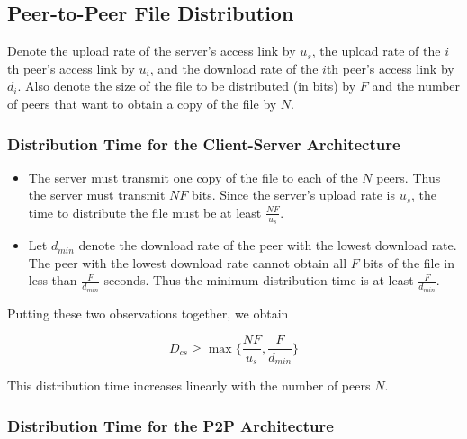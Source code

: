 \documentclass[11pt]{article}
\begin{document}
\subsection{Peer-to-Peer File Distribution}

Denote the upload rate of the server’s access link by $u_s$, the upload rate of the $i$th peer’s access link by $u_i$, and the download rate of the $i$th peer’s access link by $d_i$. Also denote the size of the file to be distributed (in bits) by $F$ and the number of peers that want to obtain a copy of the file by $N$. 

\subsubsection{Distribution Time for the Client-Server Architecture}

\begin{itemize}
	\item 
	
	The server must transmit one copy of the file to each of the $N$ peers. Thus the server must transmit $NF$ bits. Since the server’s upload rate is $u_s$, the time to distribute the file must be at least $\frac{NF}{u_s}$.
	
	\item
	
	Let $d_{min}$ denote the download rate of the peer with the lowest download rate. The peer with the lowest download rate cannot obtain all $F$ bits of the file in less than $\frac{F}{d_{min}}$ seconds. Thus the minimum distribution time is at least $\frac{F}{d_{min}}$.
	
\end{itemize}

Putting these two observations together, we obtain

\[
	D_{cs} \ge \max \{\frac{NF}{u_s}, \frac{F}{d_{min}} \}
\]

This distribution time increases linearly with the number of peers $N$.

\subsubsection{Distribution Time for the P2P Architecture}
\end{document}
